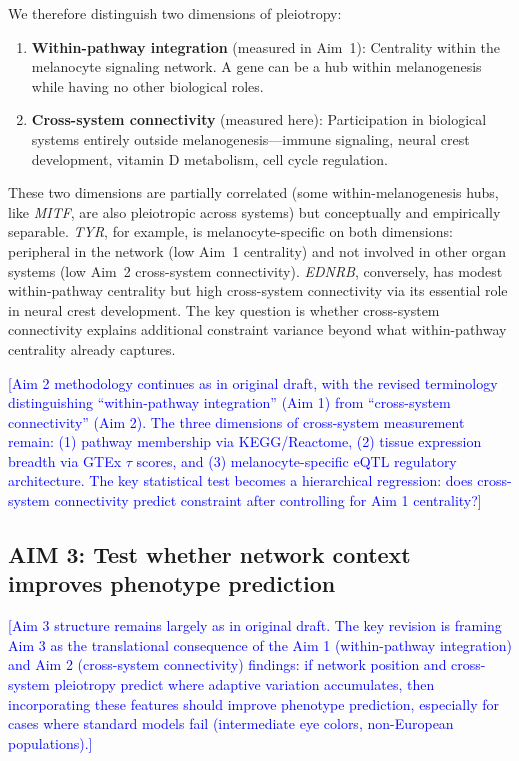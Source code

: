 \documentclass[11pt]{article}
\newcommand{\ednote}[1]{\textcolor{blue}{\textsf{[#1]}}}
\begin{document}
We therefore distinguish two dimensions of pleiotropy:
\begin{enumerate}[itemsep=2pt, topsep=2pt]
    \item \textbf{Within-pathway integration} (measured in Aim~1): Centrality within the melanocyte signaling network. A gene can be a hub within melanogenesis while having no other biological roles.
    \item \textbf{Cross-system connectivity} (measured here): Participation in biological systems entirely outside melanogenesis---immune signaling, neural crest development, vitamin D metabolism, cell cycle regulation.
\end{enumerate}

These two dimensions are partially correlated (some within-melanogenesis hubs, like \emph{MITF}, are also pleiotropic across systems) but conceptually and empirically separable. \emph{TYR}, for example, is melanocyte-specific on both dimensions: peripheral in the network (low Aim~1 centrality) and not involved in other organ systems (low Aim~2 cross-system connectivity). \emph{EDNRB}, conversely, has modest within-pathway centrality but high cross-system connectivity via its essential role in neural crest development. The key question is whether cross-system connectivity explains additional constraint variance beyond what within-pathway centrality already captures.

\ednote{Aim 2 methodology continues as in original draft, with the revised terminology distinguishing ``within-pathway integration'' (Aim 1) from ``cross-system connectivity'' (Aim 2). The three dimensions of cross-system measurement remain: (1) pathway membership via KEGG/Reactome, (2) tissue expression breadth via GTEx $\tau$ scores, and (3) melanocyte-specific eQTL regulatory architecture. The key statistical test becomes a hierarchical regression: does cross-system connectivity predict constraint after controlling for Aim 1 centrality?}

\subsection{AIM 3: Test whether network context improves phenotype prediction}

\ednote{Aim 3 structure remains largely as in original draft. The key revision is framing Aim 3 as the translational consequence of the Aim 1 (within-pathway integration) and Aim 2 (cross-system connectivity) findings: if network position and cross-system pleiotropy predict where adaptive variation accumulates, then incorporating these features should improve phenotype prediction, especially for cases where standard models fail (intermediate eye colors, non-European populations).}
\end{document}
